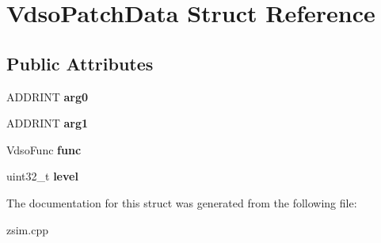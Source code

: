 \hypertarget{structVdsoPatchData}{\section{Vdso\-Patch\-Data Struct Reference}
\label{structVdsoPatchData}
}
\subsection*{Public Attributes}
\begin{DoxyCompactItemize}
\item 
\hypertarget{structVdsoPatchData_a31e27ea0a198265e6af1ff67bbf5ec77}{A\-D\-D\-R\-I\-N\-T {\bfseries arg0}}\label{structVdsoPatchData_a31e27ea0a198265e6af1ff67bbf5ec77}

\item 
\hypertarget{structVdsoPatchData_aa18c148ded18a459aa9063326c940014}{A\-D\-D\-R\-I\-N\-T {\bfseries arg1}}\label{structVdsoPatchData_aa18c148ded18a459aa9063326c940014}

\item 
\hypertarget{structVdsoPatchData_ab727fc340c5b2a3c6ba885a62ad64c69}{Vdso\-Func {\bfseries func}}\label{structVdsoPatchData_ab727fc340c5b2a3c6ba885a62ad64c69}

\item 
\hypertarget{structVdsoPatchData_aac908f8efb5b0c6386b260d7b667d35f}{uint32\-\_\-t {\bfseries level}}\label{structVdsoPatchData_aac908f8efb5b0c6386b260d7b667d35f}

\end{DoxyCompactItemize}


The documentation for this struct was generated from the following file\-:\begin{DoxyCompactItemize}
\item 
zsim.\-cpp\end{DoxyCompactItemize}
